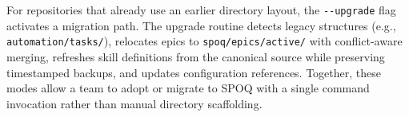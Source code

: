 For repositories that already use an earlier directory layout, the
\texttt{-{}-upgrade} flag activates a migration path. The upgrade routine
detects legacy structures (e.g., \texttt{automation/tasks/}), relocates epics
to \texttt{spoq/epics/active/} with conflict-aware merging, refreshes
skill definitions from the canonical source while preserving timestamped
backups, and updates configuration references. Together, these modes allow a
team to adopt or migrate to SPOQ with a single command invocation rather than
manual directory scaffolding.

